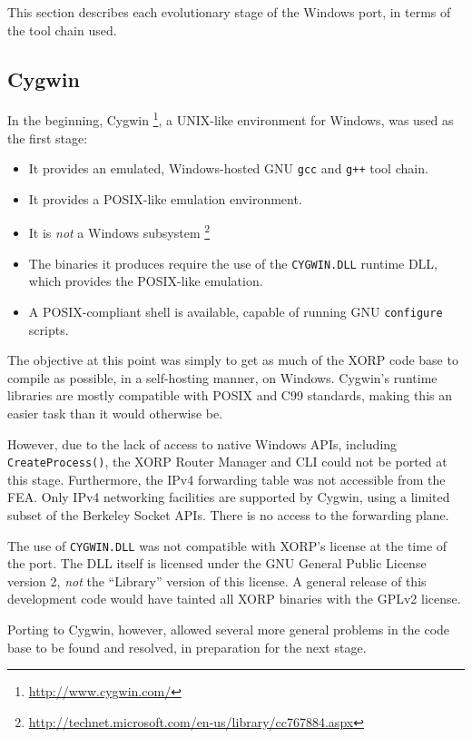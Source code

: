 \documentclass[11pt]{article}
\begin{document}
This section describes each evolutionary stage of the Windows port,
in terms of the tool chain used.

\subsection{Cygwin}

In the beginning,
Cygwin
\footnote{\url{http://www.cygwin.com/}},
a UNIX-like environment for Windows,
was used as the first stage:
\begin{itemize}
  \item It provides an emulated, Windows-hosted GNU {\tt gcc} and {\tt g++} tool chain.
  \item It provides a POSIX-like emulation environment.
  \item It is {\em not} a Windows subsystem
        \footnote{\url{http://technet.microsoft.com/en-us/library/cc767884.aspx}}
  \item The binaries it produces require the use of the {\tt CYGWIN.DLL} runtime DLL,
        which provides the POSIX-like emulation.
  \item A POSIX-compliant shell is available, capable of running GNU {\tt configure} scripts.
\end{itemize}

The objective at this point was simply to get as much of the XORP code base
to compile as possible, in a self-hosting manner, on Windows.
Cygwin's runtime libraries are mostly compatible with POSIX and C99 standards,
making this an easier task than it would otherwise be.

However, due to the lack of access to native Windows APIs, including {\tt CreateProcess()},
the XORP Router Manager and CLI could not be ported at this stage.
Furthermore, the IPv4 forwarding table was not accessible from the FEA.
Only IPv4 networking facilities are supported by Cygwin, using a
limited subset of the Berkeley Socket APIs. There is no access to the
forwarding plane.

The use of {\tt CYGWIN.DLL} was not compatible with XORP's license at the
time of the port. The DLL itself is licensed under the GNU General Public License version 2,
{\em not} the ``Library'' version of this license. A general release of this
development code would have tainted all XORP binaries with the GPLv2 license.

Porting to Cygwin, however, allowed several more general problems in the code
base to be found and resolved, in preparation for the next stage.
\end{document}
